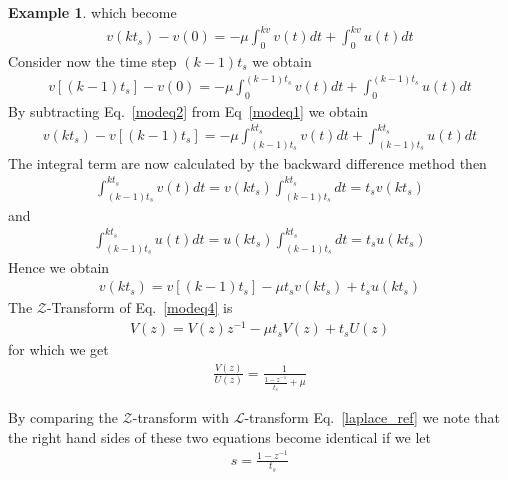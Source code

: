 \documentclass[11pt,a4paper,oneside]{book}
\numberwithin{equation}{section}
\theoremstyle{it}
\theoremstyle{definition}
\newtheorem{example}{Example}[chapter]
\begin{document}
\begin{example}
which become
\begin{equation}\label{modeq1}
	\begin{split}
		v(kt_s)-v(0) = - \mu \int_{0}^{kv} v(t) dt + \int_{0}^{kv} u(t) dt
	\end{split}
\end{equation}
Consider now the time step $(k-1)t_s$ we obtain
\begin{equation}\label{modeq2}
	\begin{split}
		v\left[(k-1)t_s\right] -v(0) = - \mu \int_{0}^{(k-1)t_s} v(t) dt + \int_{0}^{(k-1)t_s} u(t) dt
	\end{split}
\end{equation}
By subtracting Eq.~\eqref{modeq2} from Eq~\eqref{modeq1} we obtain
\begin{equation}\label{modeq3}
	\begin{split}
		v(kt_s) - v\left[(k-1)t_s\right] = - \mu \int_{(k-1)t_s}^{kt_s} v(t) dt + \int_{(k-1)t_s}^{kt_s} u(t) dt
	\end{split}
\end{equation}
The integral term are now calculated by the backward difference method then
\begin{equation}
	\begin{split}
		\int_{(k-1)t_s}^{kt_s} v(t) dt = v(kt_s) \int_{(k-1)t_s}^{kt_s}  dt 
		=t_s v(kt_s)
	\end{split}
\end{equation}
and 
\begin{equation}
	\begin{split}
		\int_{(k-1)t_s}^{kt_s} u(t) dt =  u(kt_s) \int_{(k-1)t_s}^{kt_s} dt 
		=t_s u(kt_s)
	\end{split}
\end{equation}
Hence we obtain 
\begin{equation}\label{modeq4}
	\begin{split}
		v(kt_s) = v\left[(k-1)t_s\right] - \mu t_s v(kt_s) + t_s u(kt_s)
	\end{split}
\end{equation}
The $\mathcal{Z}$-Transform of Eq.~\eqref{modeq4} is 
\begin{equation}
	\begin{split}
		V(z) = V(z)z^{-1}-\mu t_s V(z) + t_s U(z)
	\end{split}
\end{equation}
for which we get
\begin{equation}
	\begin{split}
		\frac{V(z)}{U(z)} = \frac{1}{\frac{1-z^{-1}}{t_s}+\mu}
	\end{split}
\end{equation}
\begin{mybox}
	By comparing the $\mathcal{Z}$-transform with $\mathcal{L}$-transform 
	Eq.~\eqref{laplace_ref} we note that the right hand sides of these two 
	equations become identical if we let
	\begin{equation}\label{mapping}
		\begin{split}
			s = \frac{1-z^{-1}}{t_s}
		\end{split}
	\end{equation}
\end{mybox}


\end{example}
\end{document}
